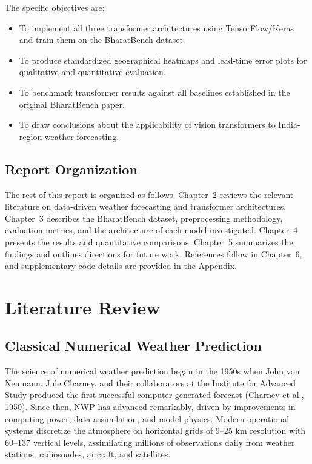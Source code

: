 \documentclass[12pt,a4paper,oneside]{report}
\begin{document}
The specific objectives are:
\begin{itemize}
    \item To implement all three transformer architectures using TensorFlow/Keras and train them on the BharatBench dataset.
    \item To produce standardized geographical heatmaps and lead-time error plots for qualitative and quantitative evaluation.
    \item To benchmark transformer results against all baselines established in the original BharatBench paper.
    \item To draw conclusions about the applicability of vision transformers to India-region weather forecasting.
\end{itemize}

\section{Report Organization}

The rest of this report is organized as follows. Chapter~2 reviews the relevant literature on data-driven weather forecasting and transformer architectures. Chapter~3 describes the BharatBench dataset, preprocessing methodology, evaluation metrics, and the architecture of each model investigated. Chapter~4 presents the results and quantitative comparisons. Chapter~5 summarizes the findings and outlines directions for future work. References follow in Chapter~6, and supplementary code details are provided in the Appendix.

\chapter{Literature Review}

\section{Classical Numerical Weather Prediction}

The science of numerical weather prediction began in the 1950s when John von Neumann, Jule Charney, and their collaborators at the Institute for Advanced Study produced the first successful computer-generated forecast (Charney et al., 1950). Since then, NWP has advanced remarkably, driven by improvements in computing power, data assimilation, and model physics. Modern operational systems discretize the atmosphere on horizontal grids of 9--25 km resolution with 60--137 vertical levels, assimilating millions of observations daily from weather stations, radiosondes, aircraft, and satellites.
\end{document}
